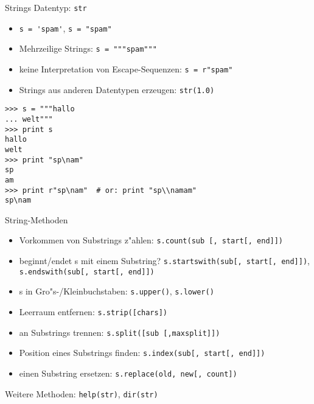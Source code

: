 \begin{frame}[fragile]{Strings}
Datentyp: \alert{\lstinline{str}}
\begin{itemize}
\item \lstinline{s = 'spam'}, \lstinline{s = "spam"}
\item Mehrzeilige Strings: \lstinline{s = """spam"""}
\item keine Interpretation von Escape-Sequenzen: \lstinline{s = r"spam"}
\item Strings aus anderen Datentypen erzeugen: \lstinline{str(1.0)}
\end{itemize}
\begin{lstlisting}[style=Shell]
>>> s = """hallo
... welt"""
>>> print s
hallo
welt
>>> print "sp\nam"
sp
am
>>> print r"sp\nam"  # or: print "sp\\namam"
sp\nam
\end{lstlisting}
\end{frame}

\begin{frame}{String-Methoden}
\begin{itemize}
\item Vorkommen von Substrings z"ahlen: \lstinline{s.count(sub [, start[, end]])}
\item beginnt/endet s mit einem Substring? \lstinline{s.startswith(sub[, start[, end]])}, \lstinline{s.endswith(sub[, start[, end]])}
\item s in Gro"s-/Kleinbuchstaben: \lstinline{s.upper()}, \lstinline{s.lower()}
\item Leerraum entfernen: \lstinline{s.strip([chars])}
\item an Substrings trennen: \lstinline{s.split([sub [,maxsplit]])}
\item Position eines Substrings finden: \lstinline{s.index(sub[, start[, end]])}
\item einen Substring ersetzen: \lstinline{s.replace(old, new[, count])}
\end{itemize}
Weitere Methoden: \lstinline{help(str)}, \lstinline{dir(str)}
\end{frame}

